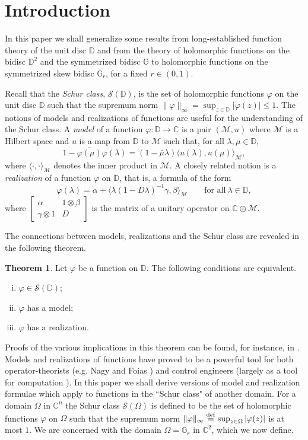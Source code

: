 \documentclass[12pt,reqno]{amsart}
\numberwithin{equation}{section}
\newcommand\lam{\lambda}
\renewcommand\phi{\varphi}
\def\d{\mathbb{D}}
\def\c{\mathbb{C}}
\newcommand\ov{\overline}
\newcommand\inv{^{-1}}
\newcommand\bbm{\begin{bmatrix}}
\newcommand\ebm{\end{bmatrix}}
\def\m{\mathcal{M}}
\def\ph{\phi}
\newcommand\df{\stackrel{\rm def}{=}}
\newcommand\ess{\mathcal{S}}
\def\be{\begin{equation}}
\def\ee{\end{equation}}
\def\ip#1#2{\langle #1,#2\rangle}
\theoremstyle{definition}
\newtheorem{thm}[equation]{Theorem}
\begin{document}
\maketitle




\section{Introduction}
In this paper we shall generalize some results from long-established function theory of the unit disc  $\mathbb{D}$  and from the theory of holomorphic functions on the bidisc $\mathbb{D}^{2}$  and  the symmetrized bidisc $\mathbb{G}$
 to holomorphic functions on  the symmetrized skew bidisc
$ \mathbb{G}_{r} $, for a fixed $r \in (0,1)$.

Recall that the {\em Schur class}, $\ess(\d)$, is the set of holomorphic functions $\ph$ on the unit disc $\d$ such that the supremum norm 
$\|\ph\|_\infty = \sup_{z\in\d}|\ph(z)|\leq 1$.
The notions of models and realizations of functions are useful for the understanding of the Schur class.
A {\em model} of a function $\ph:\d\to \c$ is a pair $(\m,u)$ where $\m$ is a Hilbert space and $u$ is a map from $\d$ to $\m$ such that, for all $\lam,\mu\in\d$,
\be\label{eqmodelD}
1-\ov{\ph(\mu)}\ph(\lam) = (1-\bar\mu \lam)\ip{u(\lam)}{u(\mu)}_\m,
\ee
where $\ip{\cdot}{\cdot}_\m$ denotes the inner product in $\m$.
A closely related notion is a {\em realization} of a function $\ph$ on $\d$, that is, a formula of the form
\be\label{realize-1}
\ph(\lam) =\alpha + \ip{\lam(1-D\lam)\inv \gamma}{\beta}_\m\qquad  \text{for all} \ \lam\in\d,
\ee
where $\bbm \alpha & 1\otimes \beta\\ \gamma\otimes 1 & D\ebm$ is the matrix of a  unitary operator on $\c\oplus \m$.

The connections between models, realizations and the Schur class are revealed in the following theorem.
\begin{thm}\label{1} Let $\ph$ be a function on $\d$.  The following conditions are equivalent.
\begin{enumerate}[(i)]
\item $\ph \in \ess(\d)$;
\item $\ph$ has a model;
\item $\ph$ has a realization.
\end{enumerate}
\end{thm}
Proofs of the various implications in this theorem can be found, for instance, in \cite{amy20}.
Models and realizations of functions have proved to be a powerful tool for both operator-theorists (e.g. Nagy and Foias \cite{NF}) and control engineers (largely as a tool for computation \cite{GL}).  In this paper we shall derive versions of model and realization formulae which apply  to functions in the ``Schur class" of another domain.  For a domain $\Omega$ in $\c^n$ the Schur class $\mathcal{S}(\Omega)$ is defined to be the set of holomorphic functions $\ph$ on $\Omega$ such that the supremum norm $\|\ph\|_\infty \df \sup_{z\in\Omega}|\ph(z)|$ is at most $1$.  We are concerned with the domain $\Omega =\mathbb{G}_r$ in $\c^2$,
which we now define.
\end{document}
